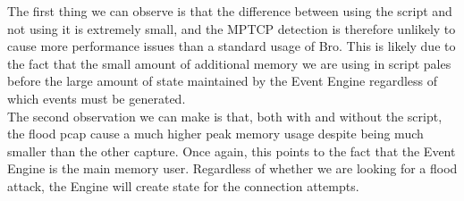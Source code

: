 The first thing we can observe is that the difference between using the script and not using it is extremely small, and the MPTCP detection is therefore unlikely to cause more performance issues than a standard usage of Bro. This is likely due to the fact that the small amount of additional memory we are using in script pales before the large amount of state maintained by the Event Engine regardless of which events must be generated. \\

The second observation we can make is that, both with and without the script, the flood pcap cause a much higher peak memory usage despite being much smaller than the other capture. Once again, this points to the fact that the Event Engine is the main memory user. Regardless of whether we are looking for a flood attack, the Engine will create state for the connection attempts.